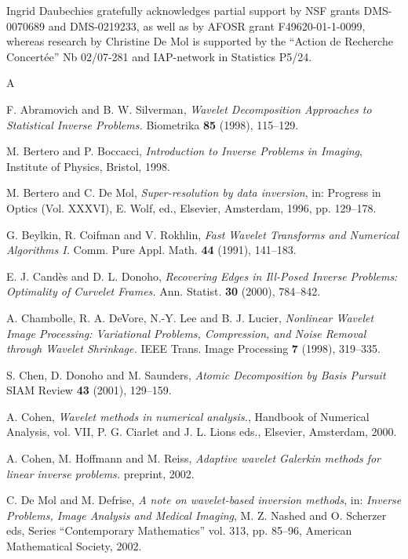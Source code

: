 \documentclass[10pt]{article}
\begin{document}
Ingrid Daubechies gratefully acknowledges partial support by NSF grants
DMS-0070689
and DMS-0219233, as well as by AFOSR grant F49620-01-1-0099, whereas research
by Christine De Mol is supported by the ``Action de Recherche Concert\'ee'' Nb
02/07-281 and IAP-network in Statistics P5/24.



\begin{thebibliography}{A}

 F. Abramovich and B. W. Silverman, \textit{Wavelet
Decomposition Approaches to Statistical Inverse Problems.} Biometrika
\textbf{85} (1998), 115--129.

 M. Bertero and P. Boccacci, \textit{Introduction to
Inverse Problems in Imaging}, Institute of Physics, Bristol, 1998.

 M. Bertero and C. De Mol, \textit{Super-resolution by
data inversion}, in: Progress in Optics (Vol. XXXVI), E. Wolf, ed.,
Elsevier, Amsterdam, 1996, pp. 129--178.

 G. Beylkin, R. Coifman and V. Rokhlin, \textit{Fast
Wavelet Transforms and Numerical Algorithms I.} Comm. Pure Appl. Math.
\textbf{44} (1991), 141--183.

 E. J. Cand\`es and D. L. Donoho, \textit{Recovering Edges
in Ill-Posed Inverse Problems: Optimality of Curvelet Frames.} Ann. Statist.
\textbf{30} (2000), 784--842.

 A. Chambolle, R. A. DeVore, N.-Y. Lee and B. J. Lucier,
\textit{Nonlinear Wavelet Image Processing: Variational Problems, Compression,
and Noise Removal through Wavelet Shrinkage.} IEEE Trans. Image Processing
\textbf{7} (1998), 319--335.

 S. Chen, D. Donoho and M. Saunders, \textit{Atomic
Decomposition by Basis Pursuit} SIAM Review \textbf{43} (2001), 129--159.

 A. Cohen, \textit{Wavelet methods in numerical
analysis.}, Handbook of Numerical Analysis, vol. VII, P. G. Ciarlet and J. L.
Lions eds., Elsevier, Amsterdam, 2000.

 A. Cohen, M. Hoffmann and M. Reiss, \textit{Adaptive
wavelet Galerkin methods for linear inverse problems.} preprint, 2002.


 C. De Mol and M. Defrise, \textit{A note on
wavelet-based inversion methods}, in: \textit{Inverse Problems, Image Analysis
and Medical Imaging},  M. Z. Nashed and O. Scherzer eds,
Series ``Contemporary Mathematics''
vol. 313, pp. 85--96, American Mathematical Society, 2002.


\end{thebibliography}
\end{document}
